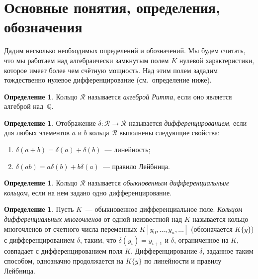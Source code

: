 \documentclass[16pt]{article}
\theoremstyle{plain1}
\theoremstyle{plain2}
\theoremstyle{plain}
\theoremstyle{plain3}
\theoremstyle{definition}
\newtheorem{definition}[theorem2]{Определение}
\theoremstyle{remark}
\begin{document}
\section{Основные понятия, определения, обозначения}
Дадим несколько необходимых определений и обозначений. Мы будем считать, что мы работаем над алгебраически замкнутым полем ${K}$ нулевой характеристики, которое имеет более чем счётную мощность. Над этим полем зададим тождественно нулевое дифференцирование (см.~определение ниже).

\begin{definition}
Кольцо $\mathcal{R}$ называется \emph{алгеброй Ритта}, если оно является алгеброй над~$\mathbb{Q}$.
\end{definition}

\begin{definition}
Отображение $\delta: \mathcal{R} \to \mathcal{R}$ называется \emph{дифференцированием}, если для любых элементов $a$ и $b$ кольца $\mathcal{R}$
выполнены следующие свойства:
\begin{enumerate}
  \item $\delta(a+b)= \delta(a)+\delta(b)$~--– линейность;
  \item $\delta(ab)=a\delta(b)+b\delta(a)$~--- правило Лейбница.
\end{enumerate}
\end{definition}

\begin{definition}
Кольцо $\mathcal{R}$ называется \emph{обыкновенным дифференциальным кольцом}, если на нем задано одно дифференцирование.
\end{definition}

\begin{definition}
Пусть $K$~--- обыкновенное дифференциальное поле.
\emph{Кольцом дифференциальных многочленов} от одной неизвестной над $K$
называется кольцо многочленов от счетного числа переменных ${K}[y_0,\ldots,y_n,\ldots]$
(обозначается ${K}\{y\}$)
с дифференцированием $\delta$, таким, что $\delta(y_i)=y_{i+1}$ и $\delta$, ограниченное на ${K}$, совпадает с дифференцированием поля $K$. Дифференцирование $\delta$, заданное таким способом, однозначно продолжается на $K\{y\}$ по линейности и правилу Лейбница.
\end{definition}
\end{document}
